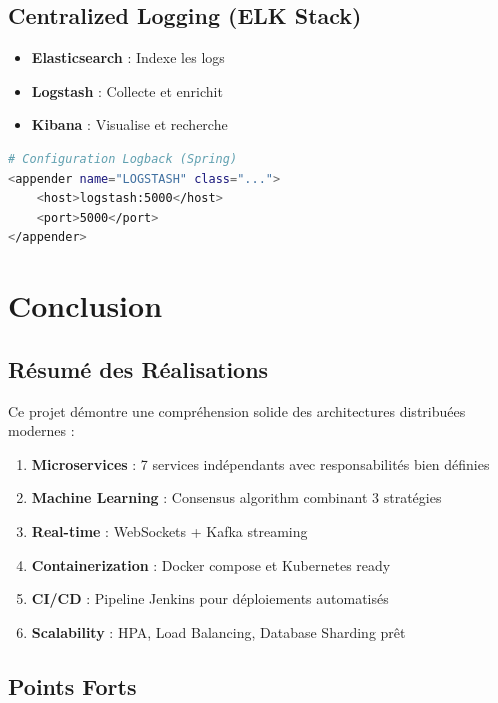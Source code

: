 \documentclass[12pt,a4paper,twoside]{report}
\begin{document}
\section{Centralized Logging (ELK Stack)}

\begin{itemize}
    \item \textbf{Elasticsearch} : Indexe les logs
    \item \textbf{Logstash} : Collecte et enrichit
    \item \textbf{Kibana} : Visualise et recherche
\end{itemize}

\begin{lstlisting}[language=bash]
# Configuration Logback (Spring)
<appender name="LOGSTASH" class="...">
    <host>logstash:5000</host>
    <port>5000</port>
</appender>
\end{lstlisting}

\chapter{Conclusion}

\section{Résumé des Réalisations}

Ce projet démontre une compréhension solide des architectures distribuées modernes :

\begin{enumerate}
    \item \textbf{Microservices} : 7 services indépendants avec responsabilités bien définies
    \item \textbf{Machine Learning} : Consensus algorithm combinant 3 stratégies
    \item \textbf{Real-time} : WebSockets + Kafka streaming
    \item \textbf{Containerization} : Docker compose et Kubernetes ready
    \item \textbf{CI/CD} : Pipeline Jenkins pour déploiements automatisés
    \item \textbf{Scalability} : HPA, Load Balancing, Database Sharding prêt
\end{enumerate}

\section{Points Forts}
\end{document}

